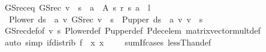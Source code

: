 \begin{isabellebody}
\endisatagproof
{\isafoldproof}%
%
\isadelimproof
\isanewline
%
\endisadelimproof
\isanewline
{}\isamarkupfalse%
\ GS{\isacharunderscore}{\kern0pt}rec{\isacharunderscore}{\kern0pt}eq{\isacharcolon}{\kern0pt}\ {\isachardoublequoteopen}GS{\isacharunderscore}{\kern0pt}rec\ v\ {\isachardollar}{\kern0pt}\ s\ {\isacharequal}{\kern0pt}\ {\isacharparenleft}{\kern0pt}{\isasymSqunion}a\ {\isasymin}\ A\ s{\isachardot}{\kern0pt}\ r\ {\isacharparenleft}{\kern0pt}s{\isacharcomma}{\kern0pt}\ a{\isacharparenright}{\kern0pt}\ {\isacharplus}{\kern0pt}\ l\ {\isacharasterisk}{\kern0pt}\ {\isacharparenleft}{\kern0pt}\isanewline
\ \ {\isacharparenleft}{\kern0pt}P{\isacharunderscore}{\kern0pt}lower\ {\isacharparenleft}{\kern0pt}d{\isacharparenleft}{\kern0pt}s\ {\isacharcolon}{\kern0pt}{\isacharequal}{\kern0pt}\ a{\isacharparenright}{\kern0pt}{\isacharparenright}{\kern0pt}\ {\isacharasterisk}{\kern0pt}v\ {\isacharparenleft}{\kern0pt}GS{\isacharunderscore}{\kern0pt}rec\ v{\isacharparenright}{\kern0pt}{\isacharparenright}{\kern0pt}\ {\isachardollar}{\kern0pt}\ s\ {\isacharplus}{\kern0pt}\ {\isacharparenleft}{\kern0pt}P{\isacharunderscore}{\kern0pt}upper\ {\isacharparenleft}{\kern0pt}d{\isacharparenleft}{\kern0pt}s\ {\isacharcolon}{\kern0pt}{\isacharequal}{\kern0pt}\ a{\isacharparenright}{\kern0pt}{\isacharparenright}{\kern0pt}\ {\isacharasterisk}{\kern0pt}v\ v{\isacharparenright}{\kern0pt}\ {\isachardollar}{\kern0pt}\ s{\isacharparenright}{\kern0pt}{\isacharparenright}{\kern0pt}{\isachardoublequoteclose}\isanewline
%
\isadelimproof
\ \ %
\endisadelimproof
%
\isatagproof
{}\isamarkupfalse%
\ GS{\isacharunderscore}{\kern0pt}rec{\isacharunderscore}{\kern0pt}def{\isacharprime}{\kern0pt}{\isacharbrackleft}{\kern0pt}of\ v\ s{\isacharbrackright}{\kern0pt}\ P{\isacharunderscore}{\kern0pt}lower{\isacharunderscore}{\kern0pt}def\ P{\isacharunderscore}{\kern0pt}upper{\isacharunderscore}{\kern0pt}def\ P{\isacharunderscore}{\kern0pt}dec{\isacharunderscore}{\kern0pt}elem\ matrix{\isacharunderscore}{\kern0pt}vector{\isacharunderscore}{\kern0pt}mult{\isacharunderscore}{\kern0pt}def\isanewline
\ \ \isamarkupfalse%
\ {\isacharparenleft}{\kern0pt}auto\ simp{\isacharcolon}{\kern0pt}\ if{\isacharunderscore}{\kern0pt}distrib{\isacharbrackleft}{\kern0pt}\ f\ {\isacharequal}{\kern0pt}\ {\isachardoublequoteopen}{\isasymlambda}x{\isachardot}{\kern0pt}\ x\ {\isacharasterisk}{\kern0pt}\ {\isacharunderscore}{\kern0pt}\ {\isachardollar}{\kern0pt}\ {\isacharunderscore}{\kern0pt}{\isachardoublequoteclose}{\isacharbrackright}{\kern0pt}\ sum{\isachardot}{\kern0pt}If{\isacharunderscore}{\kern0pt}cases\ lessThan{\isacharunderscore}{\kern0pt}def{\isacharparenright}{\kern0pt}%

\end{isabellebody}
